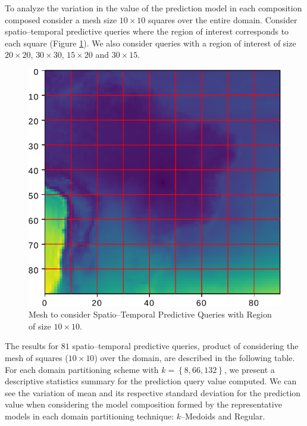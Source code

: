 To analyze the variation in the value of the prediction model in each composition composed consider a mesh size $10\times 10$ squares over the entire domain. Consider spatio--temporal predictive queries where the region of interest corresponds to each square (Figure \ref{Fig:Query_10x10_whole_real_brazil}). We also consider queries with a region of interest of size $20\times 20$, $30 \times 30$, $15 \times 20$ and $30 \times 15$. 

\begin{figure}[h]
	\centering
	\includegraphics[scale=0.75]{../Figures/query_10x10_whole_real_brazil}
	\caption{Mesh to consider Spatio--Temporal Predictive Queries with Region of size $10 \times 10$.}
	\label{Fig:Query_10x10_whole_real_brazil}
\end{figure}

The results for $81$ spatio--temporal predictive queries, product of considering the mesh of squares ($10 \times 10$) over the domain, are described in the following table. For each domain partitioning scheme with $k = \left\{8, 66, 132 \right\}$, we present a descriptive statistics summary for the prediction query value computed. We can see the variation of mean and its respective standard deviation for the prediction value when considering the model composition formed by the representative models in each domain partitioning technique: $k$--Medoids and Regular.

